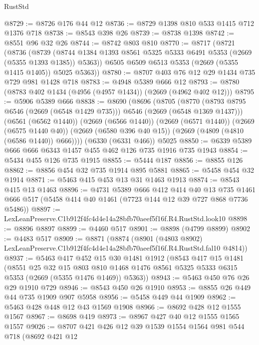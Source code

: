 \begin{lexlean}{RustStd}
\begin{coremodule}
@8729 := @8726 @176 @44 @12
@8736 := @8729 @1398 @810 @533 @1415 @712 @1376 @718
@8738 := @8543 @398 @26
@8739 := @8738 @1398
@8742 := @8551 @96 @32 @26
@8744 := @8742 @803 @810
@8770 := @8717
    (@8721
      (@8736
        (@8739 (@8744 @1384 @1393 @8561 @5325 @5333 @6491 @5353 (@2669 (@5355 @1393 @1385)) @5363))
        @6505
        @6509
        @6513
        @5353
        (@2669 (@5355 @1415 @1405))
        @5025
        @5363))
@8780 := @8707 @403 @76 @12 @29 @1434 @735 @729 @981 @1428 @718
@8783 := @4948 @5389 @666 @12
@8793 := @8780 (@8783 @402 @1434 (@4956 (@4957 @1434)) (@2669 (@4962 @402 @12)))
@8795 := @5906 @5389 @666
@8838 := @8690
    (@8696
      (@8705
        (@8770 (@8793 @8795 @6546 (@2669 (@6548 @1429 @735))) @6546 (@2669 (@6548 @1369 @1437)))
        (@6561 (@6562 @1440))
        (@2669 (@6566 @1440))
        (@2669 (@6571 @1440))
        (@2669 (@6575 @1440 @40))
        (@2669 (@6580 @396 @40 @15))
        (@2669 (@4809 (@4810 (@6586 @1440)) @666))))
    (@6330 (@6331 @466))
    @5025
@8850 := @6339 @5389 @666 @666 @6343 @1457 @455 @462 @126 @735 @1916 @735 @1943
@8854 := @5434 @455 @126 @735 @1915
@8855 := @5444 @187
@8856 := @8855 @126
@8862 := @8856 @454 @32 @735 @1914 @895 @5881
@8865 := @5458 @454 @32 @1914
@8871 := @5463 @415 @453 @13 @31 @1463 @1913
@8874 := @8543 @415 @13 @1463
@8896 := @4731
    @5389
    @666
    @412
    @414
    @40
    @13
    @735
    @1461
    @666
    @517
    (@5458 @414 @40 @1461 (@7723 @144 @12 @39 @727 @868 @7736 @5486))
@8897 := LexLeanPreserve.C1b912f4fc4d4e14a28bfb70aeef5f16f.R4.RustStd.look10
@8898 := @8896 @8897
@8899 := @4460 @517
@8901 := @8898 (@4799 @8899)
@8902 := @4483 @517
@8909 := @8871
    (@8874
      (@8901
        (@4803 @8902)
        LexLeanPreserve.C1b912f4fc4d4e14a28bfb70aeef5f16f.R4.RustStd.fal10
        @4814))
@8937 := @5463
    @417
    @452
    @15
    @30
    @1481
    @1912
    (@8543
      @417
      @15
      @1481
      (@8551
        @25
        @32
        @15
        @803
        @810
        @1468
        @1476
        @8561
        @5325
        @5333
        @6315
        @5353
        (@2669 (@5355 @1476 @1469))
        @5363))
@8943 := @5463 @450 @76 @26 @29 @1910 @729
@8946 := @8543 @450 @26 @1910
@8953 := @8855 @26 @449 @44 @735 @1909 @907 @5958
@8956 := @5458 @449 @44 @1909
@8962 := @5463 @428 @448 @12 @43 @1569 @1908
@8966 := @8692 @428 @12 @1555 @1567
@8967 := @8698 @419
@8973 := @8967 @427 @40 @12 @1555 @1565 @1557
@9026 := @8707
    @421
    @426
    @12
    @39
    @1539
    @1554
    @1564
    @981
    @544
    @718
    (@8692
      @421
      @12

\end{coremodule}
\end{lexlean}
